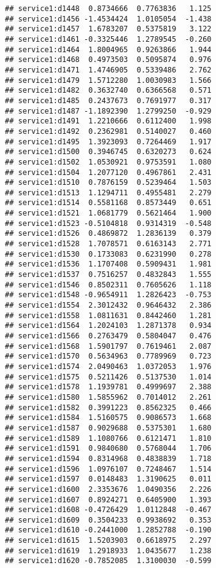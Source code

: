 \documentclass[
]{article}
\begin{document}
\begin{verbatim}
## service1:d1448  0.8734666  0.7763836   1.125
## service1:d1456 -1.4534424  1.0105054  -1.438
## service1:d1457  1.6783207  0.5375819   3.122
## service1:d1461 -0.3325446  1.2789545  -0.260
## service1:d1464  1.8004965  0.9263866   1.944
## service1:d1468  0.4973503  0.5095874   0.976
## service1:d1471  1.4746905  0.5339486   2.762
## service1:d1479  1.5712280  1.0030983   1.566
## service1:d1482  0.3632740  0.6366568   0.571
## service1:d1485  0.2437673  0.7691977   0.317
## service1:d1487 -1.1892390  1.2799250  -0.929
## service1:d1491  1.2210666  0.6112400   1.998
## service1:d1492  0.2362981  0.5140027   0.460
## service1:d1495  1.3923093  0.7264469   1.917
## service1:d1500  0.3946745  0.6320273   0.624
## service1:d1502  1.0530921  0.9753591   1.080
## service1:d1504  1.2077120  0.4967861   2.431
## service1:d1510  0.7876159  0.5239464   1.503
## service1:d1513  1.1294711  0.4955481   2.279
## service1:d1514  0.5581168  0.8573449   0.651
## service1:d1521  1.0681779  0.5621464   1.900
## service1:d1523 -0.5104818  0.9314319  -0.548
## service1:d1526  0.4869872  1.2836139   0.379
## service1:d1528  1.7078571  0.6163143   2.771
## service1:d1530  0.1733083  0.6231990   0.278
## service1:d1536  1.1707408  0.5909431   1.981
## service1:d1537  0.7516257  0.4832843   1.555
## service1:d1546  0.8502311  0.7605626   1.118
## service1:d1548 -0.9654911  1.2826423  -0.753
## service1:d1554  2.3012432  0.9646432   2.386
## service1:d1558  1.0811631  0.8442460   1.281
## service1:d1564  1.2024103  1.2871378   0.934
## service1:d1566  0.2763479  0.5804047   0.476
## service1:d1568  1.5901797  0.7619461   2.087
## service1:d1570  0.5634963  0.7789969   0.723
## service1:d1574  2.0490463  1.0372053   1.976
## service1:d1575  0.5211426  0.5137530   1.014
## service1:d1578  1.1939781  0.4999697   2.388
## service1:d1580  1.5855962  0.7014012   2.261
## service1:d1582  0.3991223  0.8562325   0.466
## service1:d1584  1.5160575  0.9086573   1.668
## service1:d1587  0.9029688  0.5375301   1.680
## service1:d1589  1.1080766  0.6121471   1.810
## service1:d1591  0.9840680  0.5768044   1.706
## service1:d1594  0.8314968  0.4838839   1.718
## service1:d1596  1.0976107  0.7248467   1.514
## service1:d1597  0.0148483  1.3190625   0.011
## service1:d1600  2.3353676  1.0490356   2.226
## service1:d1607  0.8924271  0.6405900   1.393
## service1:d1608 -0.4726429  1.0112848  -0.467
## service1:d1609  0.3504233  0.9938692   0.353
## service1:d1610 -0.2441000  1.2852788  -0.190
## service1:d1615  1.5203903  0.6618975   2.297
## service1:d1619  1.2918933  1.0435677   1.238
## service1:d1620 -0.7852085  1.3100030  -0.599

\end{verbatim}
\end{document}
